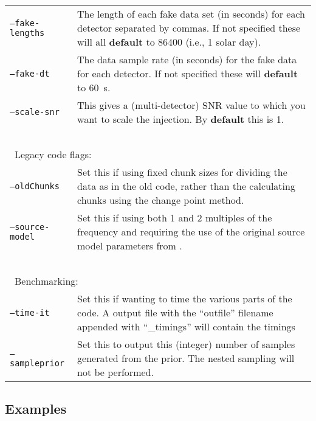 \begin{footnotesize}
\begin{longtable}{|p{}p{}|}
 {\tt --fake-lengths}    &  The length of each fake data set (in seconds) for each detector separated by commas. If not
                            specified these will all {\bf default} to 86400 (i.e., 1 solar day). \\
 {\tt --fake-dt}         &  The data sample rate (in seconds) for the fake data for each detector. If not specified these will
                            {\bf default} to 60~s. \\
 {\tt --scale-snr}       &  This gives a (multi-detector) SNR value to which you want to scale the injection. By {\bf default} this is 1. \\
 ~ & ~ \\
\multicolumn{2}{|l|}{~Legacy code flags:} \\
 {\tt --oldChunks}       &  Set this if using fixed chunk sizes for dividing the data as in the old code, rather than the
                            calculating chunks using the change point method. \\
 {\tt --source-model}    &  Set this if using both 1 and 2 multiples of the frequency and requiring the use of the original source
                            model parameters from \citet{2015MNRAS.453.4399P}. \\
 ~ & ~ \\
\multicolumn{2}{|l|}{~Benchmarking:} \\
 {\tt --time-it}         &  Set this if wanting to time the various parts of the code. A output file with the ``outfile'' filename
                            appended with ``\_timings'' will contain the timings \\
 {\tt --sampleprior}     &  Set this to output this (integer) number of samples generated from the prior. The nested sampling will not
                            be performed. \\
\hline
\end{longtable}
\end{footnotesize}

\subsection{Examples}\label{app:examples}

